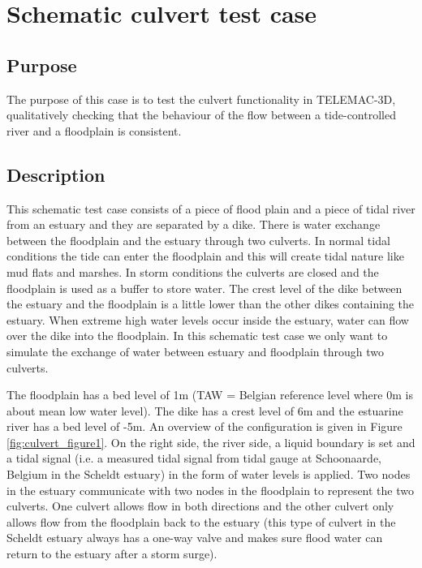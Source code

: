 \chapter{Schematic culvert test case}
%

%
\section{Purpose}
%
The purpose of this case is to test the culvert functionality in TELEMAC-3D, qualitatively checking that
the behaviour of the flow between a tide-controlled river and a floodplain is consistent.

\section{Description}
%
This schematic test case consists of a piece of flood plain and a piece of tidal river
from an estuary and they are separated by a dike.
There is water exchange between the floodplain and the estuary through two culverts.
In normal tidal conditions the tide can enter the floodplain and this will create tidal nature like mud flats and marshes.
In storm conditions the culverts are closed and the floodplain is used as a buffer to store water.
The crest level of the dike between the estuary and the floodplain is a little lower than the other dikes containing the estuary.
When extreme high water levels occur inside the estuary, water can flow over the dike into the floodplain.
In this schematic test case we only want to simulate the exchange of water between estuary and floodplain through two culverts.

The floodplain has a bed level of 1m (TAW = Belgian reference level where 0m is about mean low water level).
The dike has a crest level of 6m and the estuarine river has a bed level of -5m.
An overview of the configuration is given in Figure \ref{fig:culvert_figure1}.
On the right side, the river side, a liquid boundary is set and a tidal signal
(i.e. a measured tidal signal from tidal gauge at Schoonaarde, Belgium in the Scheldt estuary)
in the form of water levels is applied.
Two nodes in the estuary communicate with two nodes in the floodplain to represent the two culverts.
One culvert allows flow in both directions and the other culvert only allows flow from the floodplain back to the estuary
(this type of culvert in the Scheldt estuary always has a one-way valve and makes sure flood water can return to the estuary after a storm surge).

